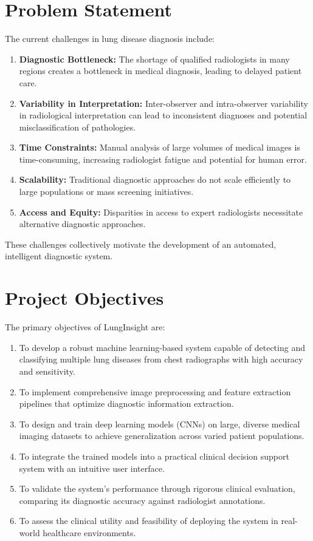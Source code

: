 {\section{Problem Statement}

The current challenges in lung disease diagnosis include:

\begin{enumerate}
    \item \textbf{Diagnostic Bottleneck:} The shortage of qualified radiologists in many regions creates a bottleneck in medical diagnosis, leading to delayed patient care.
    \item \textbf{Variability in Interpretation:} Inter-observer and intra-observer variability in radiological interpretation can lead to inconsistent diagnoses and potential misclassification of pathologies.
    \item \textbf{Time Constraints:} Manual analysis of large volumes of medical images is time-consuming, increasing radiologist fatigue and potential for human error.
    \item \textbf{Scalability:} Traditional diagnostic approaches do not scale efficiently to large populations or mass screening initiatives.
    \item \textbf{Access and Equity:} Disparities in access to expert radiologists necessitate alternative diagnostic approaches.
\end{enumerate}

These challenges collectively motivate the development of an automated, intelligent diagnostic system.

\section{Project Objectives}

The primary objectives of LungInsight are:

\begin{enumerate}
    \item To develop a robust machine learning-based system capable of detecting and classifying multiple lung diseases from chest radiographs with high accuracy and sensitivity.
    \item To implement comprehensive image preprocessing and feature extraction pipelines that optimize diagnostic information extraction.
    \item To design and train deep learning models (CNNs) on large, diverse medical imaging datasets to achieve generalization across varied patient populations.
    \item To integrate the trained models into a practical clinical decision support system with an intuitive user interface.
    \item To validate the system's performance through rigorous clinical evaluation, comparing its diagnostic accuracy against radiologist annotations.
    \item To assess the clinical utility and feasibility of deploying the system in real-world healthcare environments.
\end{enumerate}

}
